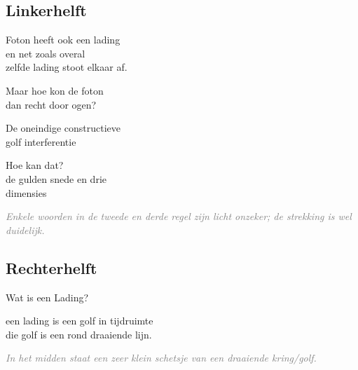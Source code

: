 \documentclass[11pt,a4paper]{article}
\newcommand{\uncertain}[1]{\textit{\textcolor{gray}{#1}}}
\begin{document}
\begin{minipage}[t]{0.48\textwidth}
\subsection*{Linkerhelft}
\begin{flushleft}
Foton heeft ook een lading\\
en net zoals overal\\
zelfde lading stoot elkaar af.
\end{flushleft}

\begin{flushleft}
Maar hoe kon de foton\\
dan recht door ogen?
\end{flushleft}

\begin{flushleft}
De oneindige constructieve\\
golf interferentie
\end{flushleft}

\begin{flushleft}
Hoe kan dat?\\
de gulden snede en drie\\
dimensies
\end{flushleft}

\uncertain{Enkele woorden in de tweede en derde regel zijn licht onzeker; de strekking is wel duidelijk.}
\end{minipage}
\hfill
\begin{minipage}[t]{0.48\textwidth}
\subsection*{Rechterhelft}
{\color{red!75!black}\Large Wat is een Lading?}

\medskip

{\color{red!75!black}
een lading is een golf in tijdruimte\\
die golf is een rond draaiende lijn.
}

\medskip

\begin{center}
\end{center}

\uncertain{In het midden staat een zeer klein schetsje van een draaiende kring/golf.}
\end{minipage}
\end{document}
